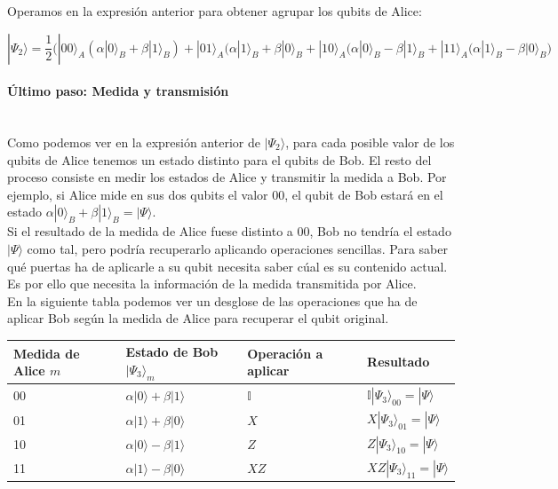 \documentclass[11pt]{article}
\newcommand{\I}{\mathbb{I}}
\newcommand{\ra}{\rangle}
\newcommand{\myparagraph}[1]{\paragraph*{#1}\mbox{}\\}
\theoremstyle{plain}
\begin{document}
Operamos en la expresión anterior para obtener agrupar los qubits de Alice:

\[
	|\Psi_2\ra =\frac{1}{2} \bigg( |00\ra_A (\alpha|0\ra_B + \beta|1\ra_B) + |01\ra_A (\alpha|1\ra_B + \beta|0\ra_B + |10\ra_A (\alpha|0\ra_B - \beta|1\ra_B + |11\ra_A (\alpha|1\ra_B - \beta|0\ra_B \bigg)
\]

\myparagraph{Último paso: Medida y transmisión}

Como podemos ver en la expresión anterior de $|\Psi_2\ra$, para cada posible valor de los qubits de Alice tenemos un estado distinto para el qubits de Bob. El resto del proceso consiste en medir los estados de Alice y transmitir la medida a Bob. Por ejemplo, si Alice mide en sus dos qubits el valor $00$, el qubit de Bob estará en el estado $\alpha|0\ra_B + \beta|1\ra_B = |\Psi\ra$. \\

Si el resultado de la medida de Alice fuese distinto a $00$, Bob no tendría el estado $|\Psi\ra$ como tal, pero podría recuperarlo aplicando operaciones sencillas. Para saber qué puertas ha de aplicarle a su qubit necesita saber cúal es su contenido actual. Es por ello que necesita la información de la medida transmitida por Alice. \\

En la siguiente tabla podemos ver un desglose de las operaciones que ha de aplicar Bob según la medida de Alice para recuperar el qubit original.

\begin{table}[H]
	\begin{tabular}{llll}
		\textbf{Medida de Alice $m$} & \textbf{Estado de Bob $|\Psi_3\ra_m$} & \textbf{Operación a aplicar} & \textbf{Resultado}                               \\ \hline
		00                           & $\alpha|0\ra + \beta|1\ra$                            & $\I$                         & $\I |\Psi _3\ra_{00} = |\Psi\ra$ \\
		01                           & $\alpha|1\ra + \beta|0\ra$                            & $X$                          & $X |\Psi _3\ra_{01} = |\Psi\ra$  \\
		10                           & $\alpha|0\ra - \beta|1\ra$                            & $Z$                          & $Z |\Psi _3\ra_{10} = |\Psi\ra$  \\
		11                           & $\alpha|1\ra - \beta|0\ra$                            & $XZ$                         & $XZ |\Psi _3\ra_{11} = |\Psi\ra$
	\end{tabular}
\end{table}
\end{document}
